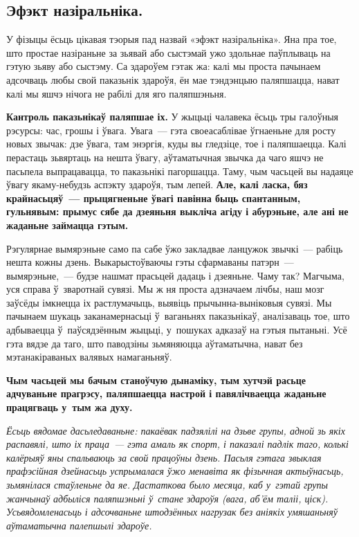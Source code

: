 \subsection*{Эфэкт назіральніка.}

У фізыцы ёсьць цікавая тэорыя пад назвай «эфэкт назіральніка». Яна пра тое, што простае назіраньне за зьявай або сыстэмай ужо здольнае паўплываць на гэтую зьяву або сыстэму. Са здароўем гэтак жа: калі мы проста пачынаем адсочваць любы свой паказьнік здароўя, ён мае тэндэнцыю паляпшацца, нават калі мы яшчэ нічога не рабілі для яго паляпшэньня.

\textbf{Кантроль паказьнікаў паляпшае іх.} У жыцьці чалавека ёсьць тры галоўныя рэсурсы: час, грошы і ўвага. Увага~--- гэта своеасаблівае ўгнаеньне для росту новых звычак: дзе ўвага, там энэргія, куды вы гледзіце, тое і паляпшаецца. Калі перастаць зьвяртаць на нешта ўвагу, аўтаматычная звычка да чаго яшчэ не пасьпела выпрацавацца, то паказьнікі пагоршацца. Таму, чым часьцей вы надаяце ўвагу якаму-небудзь аспэкту здароўя, тым лепей. \textbf{Але, калі ласка, бяз крайнасьцяў~--- прыцягненьне ўвагі павінна быць спантанным, гульнявым: прымус сябе да дзеяньня выкліча агіду і абурэньне, але ані не жаданьне займацца гэтым.}

Рэгулярнае вымярэньне само па сабе ўжо закладвае ланцужок звычкі~--- рабіць нешта кожны дзень. Выкарыстоўваючы гэты сфармаваны патэрн~--- вымярэньне,~--- будзе нашмат прасьцей дадаць і дзеяньне. Чаму так? Магчыма, уся справа ў~зваротнай сувязі. Мы ж ня проста адзначаем лічбы, наш мозг заўсёды імкнецца іх растлумачыць, выявіць прычынна-выніковыя сувязі. Мы пачынаем шукаць заканамернасьці ў~ваганьнях паказьнікаў, аналізаваць тое, што адбываецца ў~паўсядзённым жыцьці, у~пошуках адказаў на гэтыя пытаньні. Усё гэта вядзе да таго, што паводзіны зьмяняюцца аўтаматычна, нават без мэтанакіраваных валявых намаганьняў. 

\textbf{Чым часьцей мы бачым станоўчую дынаміку, тым хутчэй расьце адчуваньне прагрэсу, паляпшаецца настрой і павялічваецца жаданьне працягваць у~тым жа духу.}

\emph{Ёсьць вядомае дасьледаваньне: пакаёвак падзялілі на дзьве групы, адной зь якіх распавялі, што іх праца~--- гэта амаль як спорт, і паказалі падлік таго, колькі калёрыяў яны спальваюць за свой працоўны дзень. Пасьля гэтага звыклая прафэсійная дзейнасьць успрымалася ўжо менавіта як фізычная актыўнасьць, зьмянілася стаўленьне да яе. Дастаткова было месяца, каб у~гэтай групы жанчынаў адбыліся паляпшэньні ў~стане здароўя (вага, аб'ём таліі, ціск). Усьвядомленасьць і адсочваньне штодзённых нагрузак без аніякіх умяшаньняў аўтаматычна палепшылі здароўе.}

